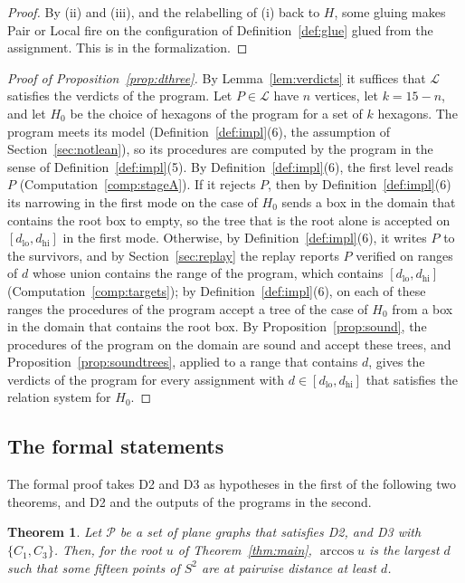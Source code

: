 \documentclass[12pt]{amsart}
\newtheorem{theorem}{Theorem}[section]
\theoremstyle{definition}
\theoremstyle{plain}
\theoremstyle{definition}
\newcommand{\Sph}{S^2}
\newcommand{\dlo}{d_{\mathrm{lo}}}
\newcommand{\dhi}{d_{\mathrm{hi}}}
\newcommand{\CI}{C_1}
\newcommand{\CIII}{C_3}
\newcommand{\leanmap}[1]{\ignorespaces}
\newcommand{\mapnote}[1]{\ignorespaces}
\begin{document}
\begin{proof}
By (ii) and (iii), and the relabelling of (i) back to $H$, some gluing makes Pair or Local fire on the configuration of Definition~\ref{def:glue} glued from the assignment. This is  in the formalization.
\end{proof}

\begin{proof}[Proof of Proposition~\ref{prop:dthree}]
By Lemma~\ref{lem:verdicts} it suffices that $\mathcal L$ satisfies the verdicts of the program. Let $P\in \mathcal L$ have $n$ vertices, let $k=15-n$, and let $H_0$ be the choice of hexagons of the program for a set of $k$ hexagons. The program meets its model (Definition~\ref{def:impl}(6), the assumption of Section~\ref{sec:notlean}), so its procedures are computed by the program in the sense of Definition~\ref{def:impl}(5). By Definition~\ref{def:impl}(6), the first level reads $P$ (Computation~\ref{comp:stageA}). If it rejects $P$, then by Definition~\ref{def:impl}(6) its narrowing in the first mode on the case of $H_0$ sends a box in the domain that contains the root box to empty, so the tree that is the root alone is accepted on $[\dlo,\dhi]$ in the first mode. Otherwise, by Definition~\ref{def:impl}(6), it writes $P$ to the survivors, and by Section~\ref{sec:replay} the replay reports $P$ verified on ranges of $d$ whose union contains the range of the program, which contains $[\dlo,\dhi]$ (Computation~\ref{comp:targets}); by Definition~\ref{def:impl}(6), on each of these ranges the procedures of the program accept a tree of the case of $H_0$ from a box in the domain that contains the root box. By Proposition~\ref{prop:sound}, the procedures of the program on the domain are sound and accept these trees, and Proposition~\ref{prop:soundtrees}, applied to a range that contains $d$, gives the verdicts of the program for every assignment with $d\in[\dlo,\dhi]$ that satisfies the relation system for $H_0$.
\end{proof}

\subsection{The formal statements}\label{sec:formalstatements}
The formal proof takes D2 and D3 as hypotheses in the first of the following two theorems, and D2 and the outputs of the programs in the second.

\begin{theorem}\label{thm:formal}\leanmap{Tammes15.conjecture_of_enum_killed, Tammes15.conjecture_of_frames, Tammes15.reduction, Tammes15.upperBound_of_hyps, Tammes15.realisation_transport, Tammes15.realisation_iso, Tammes15.realisation_reverse, Tammes15.D2Regions.planeClass_of_structured, Tammes15.attained_of_hyp, Tammes15.conjecture_iff, Tammes15.existsUnique_root}\mapnote{the conclusion is \texttt{Tammes15.Conjecture}, the formal statement of Theorem \ref{thm:main}}
Let $\mathcal P$ be a set of plane graphs that satisfies D2, and D3 with $\{\CI,\CIII\}$. Then, for the root $u$ of Theorem~\ref{thm:main}, $\arccos u$ is the largest $d$ such that some fifteen points of $\Sph$ are at pairwise distance at least $d$.
\end{theorem}
\end{document}
